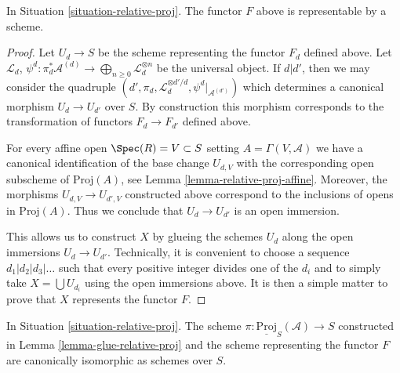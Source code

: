 \begin{lemma}
\label{lemma-relative-proj}
In Situation \ref{situation-relative-proj}.
The functor $F$ above is representable by a scheme.
\end{lemma}

\begin{proof}
Let $U_d \to S$ be the scheme representing the functor $F_d$
defined above. Let $\mathcal{L}_d$,
$\psi^d : \pi_d^*\mathcal{A}^{(d)} \to
\bigoplus_{n \geq 0} \mathcal{L}_d^{\otimes n}$ be the universal object.
If $d | d'$, then we may consider the quadruple
$(d', \pi_d, \mathcal{L}_d^{\otimes d'/d}, \psi^d|_{\mathcal{A}^{(d')}})$
which determines a canonical morphism $U_d \to U_{d'}$ over $S$.
By construction this morphism corresponds to the transformation
of functors $F_d \to F_{d'}$ defined above.

\medskip\noindent
For every affine open $\Spec(R) = V \subset S$
setting $A = \Gamma(V, \mathcal{A})$ we have a canonical
identification of the base change $U_{d, V}$ with the corresponding open
subscheme of $\text{Proj}(A)$, see Lemma \ref{lemma-relative-proj-affine}.
Moreover, the morphisms $U_{d, V} \to U_{d', V}$ constructed above
correspond to the inclusions of opens in $\text{Proj}(A)$.
Thus we conclude that $U_d \to U_{d'}$ is an open immersion.

\medskip\noindent
This allows us to construct $X$
by glueing the schemes $U_d$ along the open immersions $U_d \to U_{d'}$.
Technically, it is convenient to choose a sequence
$d_1 | d_2 | d_3 | \ldots$ such that every positive integer
divides one of the $d_i$ and to simply take
$X = \bigcup U_{d_i}$ using the open immersions above.
It is then a simple matter to prove that $X$ represents the
functor $F$.
\end{proof}

\begin{lemma}
\label{lemma-glueing-gives-functor-proj}
In Situation \ref{situation-relative-proj}.
The scheme $\pi : \underline{\text{Proj}}_S(\mathcal{A}) \to S$
constructed in Lemma \ref{lemma-glue-relative-proj}
and the scheme representing the functor $F$
are canonically isomorphic as schemes over $S$.
\end{lemma}

